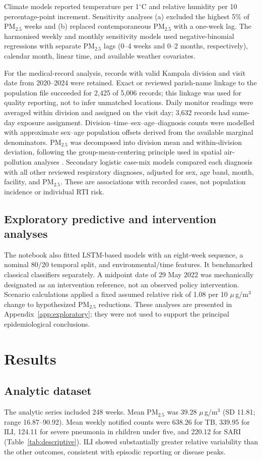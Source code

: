 \documentclass[12pt,a4paper]{report}
\newcommand{\pmfive}{PM$_{2.5}$}
\newcommand{\ugm}{\ensuremath{\mu}\,g/m$^3$}
\begin{document}
Climate models reported temperature per 1$^\circ$C and relative humidity per 10 percentage-point increment. Sensitivity analyses (a) excluded the highest 5\% of \pmfive{} weeks and (b) replaced contemporaneous \pmfive{} with a one-week lag. The harmonised weekly and monthly sensitivity models used negative-binomial regressions with separate \pmfive{} lags (0--4 weeks and 0--2 months, respectively), calendar month, linear time, and available weather covariates.

For the medical-record analysis, records with valid Kampala division and visit date from 2020--2024 were retained. Exact or reviewed parish-name linkage to the population file succeeded for 2,425 of 5,006 records; this linkage was used for quality reporting, not to infer unmatched locations. Daily monitor readings were averaged within division and assigned on the visit day; 3,632 records had same-day exposure assignment. Division--time--sex--age--diagnosis counts were modelled with approximate sex--age population offsets derived from the available marginal denominators. \pmfive{} was decomposed into division mean and within-division deviation, following the group-mean-centering principle used in spatial air-pollution analyses \parencite{Adjorlolo2026}. Secondary logistic case-mix models compared each diagnosis with all other reviewed respiratory diagnoses, adjusted for sex, age band, month, facility, and \pmfive{}. These are associations with recorded cases, not population incidence or individual RTI risk.

\section{Exploratory predictive and intervention analyses}
The notebook also fitted LSTM-based models with an eight-week sequence, a nominal 80/20 temporal split, and environmental/time features. It benchmarked classical classifiers separately. A midpoint date of 29 May 2022 was mechanically designated as an intervention reference, not an observed policy intervention. Scenario calculations applied a fixed assumed relative risk of 1.08 per 10 \ugm{} change to hypothesized \pmfive{} reductions. These analyses are presented in Appendix~\ref{app:exploratory}; they were not used to support the principal epidemiological conclusions.

\chapter{Results}
\section{Analytic dataset}
The analytic series included 248 weeks. Mean \pmfive{} was 39.28 \ugm{} (SD 11.81; range 16.87--90.92). Mean weekly notified counts were 638.26 for TB, 339.95 for ILI, 124.11 for severe pneumonia in children under five, and 220.12 for SARI (Table~\ref{tab:descriptive}). ILI showed substantially greater relative variability than the other outcomes, consistent with episodic reporting or disease peaks.
\end{document}
